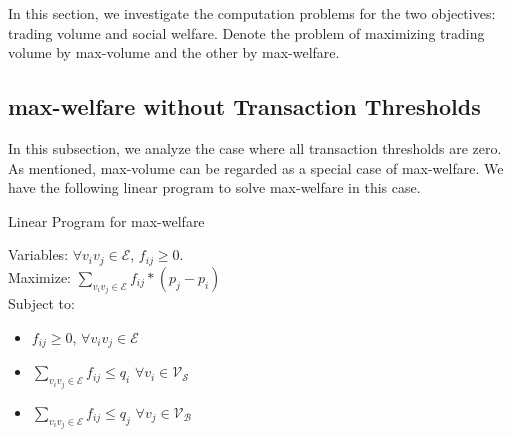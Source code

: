 \documentclass{aamas2015}
\begin{document}
In this section, we investigate the computation problems for the two objectives: trading volume and social welfare. Denote the problem of maximizing trading volume by {\sc max-volume} and the other by {\sc max-welfare}.
%

\subsection{{\sc max-welfare} without Transaction Thresholds}

In this subsection, we analyze the case where all transaction thresholds are zero. As mentioned, {\sc max-volume} can be regarded as a special case of {\sc max-welfare}. We have the following linear program to solve {\sc max-welfare} in this case.

\begin{algorithm}\label{alg:nai}
	\caption{Linear Program for {\sc max-welfare}}
	Variables: $\forall v_iv_j\in \mathcal{E}$, $f_{ij}\geq 0$.\\
	Maximize: $\sum_{v_iv_j\in \mathcal{E}}f_{ij}*(p_j-p_i) $\\
	Subject to: \\
	\begin{itemize}
		\item $f_{ij}\geq 0$, $ \forall v_iv_j\in \mathcal{E}$\\
		\item $\sum_{v_iv_j\in \mathcal{E}}f_{ij}\leq q_i$ $\forall v_i\in \mathcal{V_S}$\\
		\item $\sum_{v_iv_j\in \mathcal{E}}f_{ij}\leq q_j$ $\forall v_j\in \mathcal{V_B}$\\
	\end{itemize}
\end{algorithm}
\end{document}
